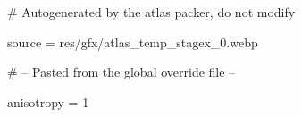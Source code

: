 # Autogenerated by the atlas packer, do not modify

source = res/gfx/atlas_temp_stagex_0.webp

# -- Pasted from the global override file --

anisotropy = 1
